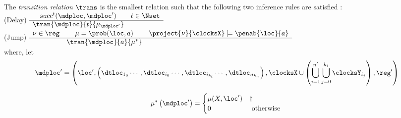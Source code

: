 \begin{definition}

The \emph{transition relation} $\trans$ is the smallest relation such that the following two inference rules are satisfied : \\
(Delay)
$
    \begin{array}{cc}
        \successor^{t} (
            \mdploc,
            \mdploc'
        )
        &
        t \in \Nset \\
        \hline
        \tran
            {\mdploc}
            {t}
            {\mu_{\mdploc'}}
        &
    \end{array}
$
\\
(Jump)
$
    \begin{array}{ccc}
        \nu \in \reg
        &
        \mu = \prob ( \loc, a)
        &
        \project{\nu}{\clocksX} \models \penab{\loc}{a}
        \\
        \hline
        &
        \tran
            {\mdploc}
            {a}
            {\mu^*}
        &
    \end{array}
$
\\
where, let 
\\
$$
\mdploc' =  \left (
    \loc'
    ,
    \left (
        \dtloc_{1_0}
        \cdots,
        \dtloc_{i_0}
        \cdots,
        \dtloc_{i_{k_i}}
        \cdots,
        \dtloc_{n_{k_n}}
    \right )
    ,
    \clocksX \cup \left(
        \bigcup_{i=1}^{n'} \bigcup_{j=0}^{k_i} \clocksY_{i_j}
    \right )
    ,
    \reg'
\right )
$$

\begin{align*}
    \mu^* \left (
       \mdploc'
    \right )
    = 
    \begin{cases}
        \mu(X,\loc')
        &
        \dag
        \\
        0
        & 
        \mbox{  otherwise }
    \end{cases}
\end{align*} 


\end{definition}
